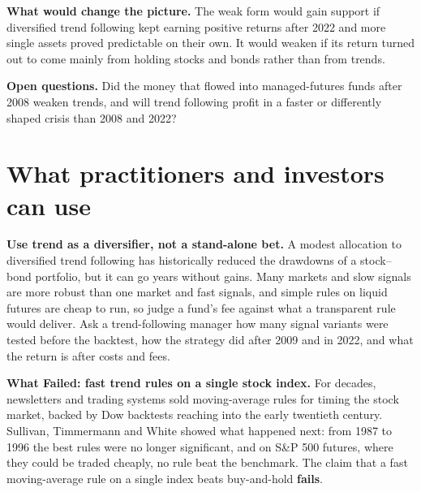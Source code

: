 \textbf{What would change the picture.} The weak form would gain support if diversified trend following kept earning positive returns after 2022 and more single assets proved predictable on their own. It would weaken if its return turned out to come mainly from holding stocks and bonds rather than from trends.

\label{sec:08-open}
\textbf{Open questions.} Did the money that flowed into managed-futures funds after 2008 weaken trends, and will trend following profit in a faster or differently shaped crisis than 2008 and 2022?

\section{What practitioners and investors can use}
\label{sec:08-investors}

\textbf{Use trend as a diversifier, not a stand-alone bet.} A modest allocation to diversified trend following has historically reduced the drawdowns of a stock--bond portfolio, but it can go years without gains. Many markets and slow signals are more robust than one market and fast signals, and simple rules on liquid futures are cheap to run, so judge a fund's fee against what a transparent rule would deliver. Ask a trend-following manager how many signal variants were tested before the backtest, how the strategy did after 2009 and in 2022, and what the return is after costs and fees.

\begin{callout}
\textbf{What Failed: fast trend rules on a single stock index.} For decades, newsletters and trading systems sold moving-average rules for timing the stock market, backed by Dow backtests reaching into the early twentieth century. Sullivan, Timmermann and White showed what happened next: from 1987 to 1996 the best rules were no longer significant, and on S\&P 500 futures, where they could be traded cheaply, no rule beat the benchmark. The claim that a fast moving-average rule on a single index beats buy-and-hold \textbf{fails}.
\end{callout}

\makeatletter
{}
\makeatother

